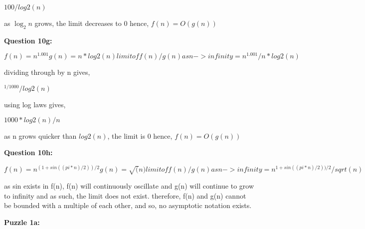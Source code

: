 \documentclass{article}
\begin{document}
\(100/log2(n)\)

as \(\log_2 n\) grows, the limit decreases to \(0\)
hence, \(f(n) = O(g(n))\)

\textbf{Question 10g:}

\begin{math}
f(n) = n^{1.001}
g(n) = n*log2(n)

limit of f(n)/g(n) as n -> infinity = n^{1.001}/n*log2(n)
\end{math}

dividing through by n gives,

\(^{1/1000}/log2(n)\)

using log laws gives,

\(1000*log2(n)/n\)

as n grows quicker than \(log2(n)\), the limit is 0
hence, \(f(n) = O(g(n))\)

\textbf{Question 10h:}

\begin{math}
    f(n) = n^{(1+sin((pi*n)/2))/2}
    g(n) = \sqrt(n)
    limit of f(n)/g(n) as n -> infinity = n^{1+sin((pi*n)/2))/2}/sqrt(n)
\end{math}

as sin exists in f(n), f(n) will continuously oscillate
and g(n) will continue to grow to infinity
and as such, the limit does not exist.
therefore, f(n) and g(n) cannot be bounded with a multiple of each other, and so, no asymptotic notation exists.

\textbf{Puzzle 1a:}
\end{document}
